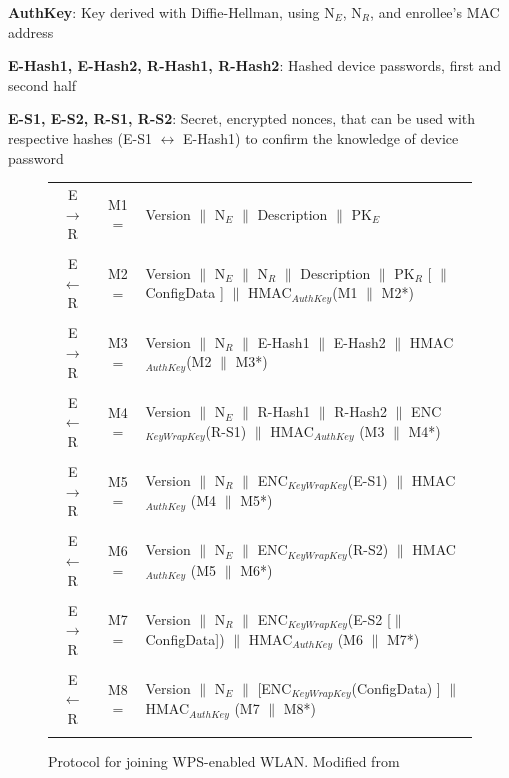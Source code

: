 \documentclass[12pt,a4paper,oneside,pdftex]{report}
\begin{document}
\textbf{AuthKey}: Key derived with Diffie-Hellman, using N$_E$, N$_R$, and enrollee's MAC address

\textbf{E-Hash1, E-Hash2, R-Hash1, R-Hash2}: Hashed device passwords, first and second half

\textbf{E-S1, E-S2, R-S1, R-S2}: Secret, encrypted nonces, that can be used with respective hashes (E-S1 $\leftrightarrow$ E-Hash1) to confirm the knowledge of device password

\begin{figure}
\label{tab:wps_full}
\begin{tabular}{c|c p{10cm}}

E $\rightarrow$ R & M1 = & Version $\|$ N$_E$ $\|$ Description $\|$ PK$_E$ 
\\\\

E $\leftarrow$  R & M2 = & Version $\|$ N$_E$ $\|$ N$_R$ $\|$ Description $\|$ PK$_R$ [ $\|$ ConfigData ] $\|$ HMAC$_{AuthKey}$(M1 $\|$ M2*) 
\\\\

E $\rightarrow$ R & M3 = & Version $\|$ N$_R$ $\|$ E-Hash1 $\|$ E-Hash2 $\|$ HMAC$_{AuthKey}$(M2 $\|$ M3*) 
\\\\

E $\leftarrow$  R & M4 = & Version $\|$ N$_E$ $\|$ R-Hash1 $\|$ R-Hash2 $\|$ ENC$_{KeyWrapKey}$(R-S1) $\|$ HMAC$_{AuthKey}$ (M3 $\|$ M4*) 
\\\\

E $\rightarrow$ R & M5 = & Version $\|$ N$_R$ $\|$ ENC$_{KeyWrapKey}$(E-S1) $\|$ HMAC$_{AuthKey}$ (M4 $\|$ M5*) 
\\\\

E $\leftarrow$  R & M6 = & Version $\|$ N$_E$ $\|$ ENC$_{KeyWrapKey}$(R-S2) $\|$ HMAC$_{AuthKey}$ (M5 $\|$ M6*) 
\\\\

E $\rightarrow$ R & M7 = & Version $\|$ N$_R$ $\|$ ENC$_{KeyWrapKey}$(E-S2 [$\|$ConfigData]) $\|$ HMAC$_{AuthKey}$ (M6 $\|$ M7*) 
\\\\

E $\leftarrow$  R & M8 = & Version $\|$ N$_E$ $\|$ [ENC$_{KeyWrapKey}$(ConfigData) ] $\|$ HMAC$_{AuthKey}$ (M7 $\|$ M8*) 
\\\\

\end{tabular}
\caption{Protocol for joining WPS-enabled WLAN. Modified from~\cite{microsoftWCN}}
\end{figure}


\end{document}
